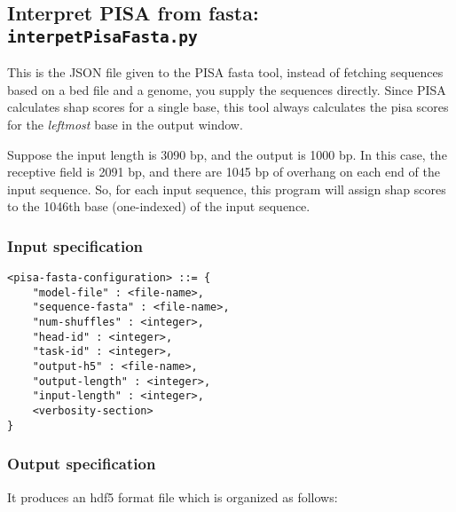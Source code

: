 \documentclass{article}
\begin{document}
\newpage

\subsection{Interpret PISA from fasta: \texttt{interpetPisaFasta.py}}

This is the JSON file given to the PISA fasta tool, instead of fetching sequences based on a bed
file and a genome, you supply the sequences directly.
Since PISA calculates shap scores for a single base, this tool always calculates the pisa scores
for the \emph{leftmost} base in the output window.

Suppose the input length is 3090 bp, and the output is 1000 bp.
In this case, the receptive field is 2091 bp, and there are 1045 bp of overhang on each end of
the input sequence.
So, for each input sequence, this program will assign shap scores to the 1046th base (one-indexed)
of the input sequence.

\subsubsection{Input specification}
\begin{lstlisting}
<pisa-fasta-configuration> ::= {
    "model-file" : <file-name>,
    "sequence-fasta" : <file-name>,
    "num-shuffles" : <integer>,
    "head-id" : <integer>,
    "task-id" : <integer>,
    "output-h5" : <file-name>,
    "output-length" : <integer>,
    "input-length" : <integer>,
    <verbosity-section>
}
\end{lstlisting}

\subsubsection{Output specification}

It produces an hdf5 format file which is organized as follows:
\end{document}
